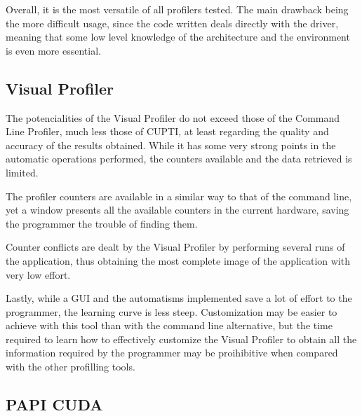 Overall, it is the most versatile of all profilers tested. The main drawback being the more difficult usage, since the code written deals directly with the driver, meaning that some low level knowledge of the architecture and the environment is even more essential.

\subsection{Visual Profiler}
\label{sec:533}

The potencialities of the Visual Profiler do not exceed those of the Command Line Profiler, much less those of CUPTI, at least regarding the quality and accuracy of the results obtained. While it has some very strong points in the automatic operations performed, the counters available and the data retrieved is limited.

The profiler counters are available in a similar way to that of the command line, yet a window presents all the available counters in the current hardware, saving the programmer the trouble of finding them.

Counter conflicts are dealt by the Visual Profiler by performing several runs of the application, thus obtaining the most complete image of the application with very low effort.

Lastly, while a GUI and the automatisms implemented save a lot of effort to the programmer, the learning curve is less steep. Customization may be easier to achieve with this tool than with the command line alternative, but the time required to learn how to effectively customize the Visual Profiler to obtain all the information required by the programmer may be proihibitive when compared with the other profilling tools.

\subsection{PAPI CUDA}
\label{sec:534}

